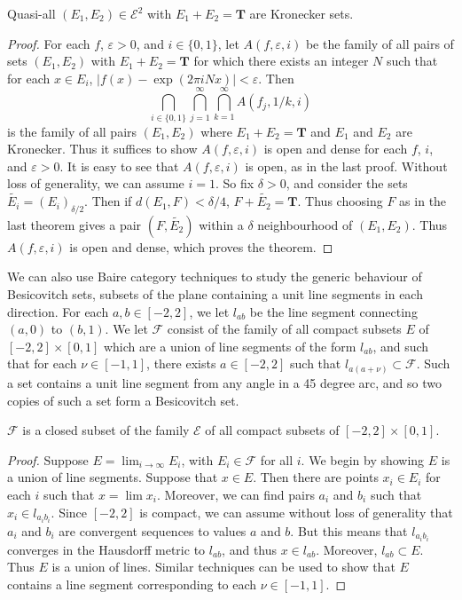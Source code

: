 \begin{theorem}
	Quasi-all $(E_1,E_2) \in \mathcal{E}^2$ with $E_1 + E_2 = \mathbf{T}$ are Kronecker sets.
\end{theorem}
\begin{proof}
	For each $f$, $\varepsilon > 0$, and $i \in \{ 0, 1 \}$, let $A(f,\varepsilon,i)$ be the family of all pairs of sets $(E_1, E_2)$ with $E_1 + E_2 = \mathbf{T}$ for which there exists an integer $N$ such that for each  $x \in E_i$, $|f(x) - \exp(2 \pi i N x)| < \varepsilon$. Then
	\[ \bigcap_{i \in \{ 0, 1 \}} \bigcap_{j = 1}^\infty \bigcap_{k = 1}^\infty A(f_j,1/k,i) \]
	is the family of all pairs $(E_1,E_2)$ where $E_1 + E_2 = \mathbf{T}$ and $E_1$ and $E_2$ are Kronecker. Thus it suffices to show $A(f,\varepsilon,i)$ is open and dense for each $f$, $i$, and $\varepsilon > 0$. It is easy to see that $A(f,\varepsilon,i)$ is open, as in the last proof. Without loss of generality, we can assume $i = 1$. So fix $\delta > 0$, and consider the sets $\widetilde{E_i} = (E_i)_{\delta/2}$. Then if $d(E_1,F) < \delta/4$, $F + \tilde{E_2} = \mathbf{T}$. Thus choosing $F$ as in the last theorem gives a pair $(F,\tilde{E_2})$ within a $\delta$ neighbourhood of $(E_1,E_2)$. Thus $A(f,\varepsilon,i)$ is open and dense, which proves the theorem.
\end{proof}

We can also use Baire category techniques to study the generic behaviour of Besicovitch sets, subsets of the plane containing a unit line segments in each direction. For each $a,b \in [-2,2]$, we let $l_{ab}$ be the line segment connecting $(a,0)$ to $(b,1)$. We let $\mathcal{F}$ consist of the family of all compact subsets $E$ of $[-2,2] \times [0,1]$ which are a union of line segments of the form $l_{ab}$, and such that for each $\nu \in [-1,1]$, there exists $a \in [-2,2]$ such that $l_{a(a+\nu)} \subset \mathcal{F}$. Such a set contains a unit line segment from any angle in a 45 degree arc, and so two copies of such a set form a Besicovitch set.

\begin{lemma}
	$\mathcal{F}$ is a closed subset of the family $\mathcal{E}$ of all compact subsets of $[-2,2] \times [0,1]$.
\end{lemma}
\begin{proof}
	Suppose $E = \lim_{i \to \infty} E_i$, with $E_i \in \mathcal{F}$ for all $i$. We begin by showing $E$ is a union of line segments. Suppose that $x \in E$. Then there are points $x_i \in E_i$ for each $i$ such that $x = \lim x_i$. Moreover, we can find pairs $a_i$ and $b_i$ such that $x_i \in l_{a_ib_i}$. Since $[-2,2]$ is compact, we can assume without loss of generality that $a_i$ and $b_i$ are convergent sequences to values $a$ and $b$. But this means that $l_{a_ib_i}$ converges in the Hausdorff metric to $l_{ab}$, and thus $x \in l_{ab}$. Moreover, $l_{ab} \subset E$. Thus $E$ is a union of lines. Similar techniques can be used to show that $E$ contains a line segment corresponding to each $\nu \in [-1,1]$.
 \end{proof}


